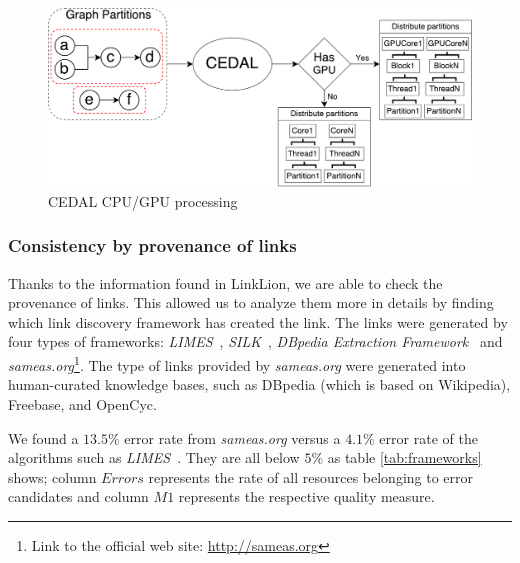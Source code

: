 \begin{figure}[H]
	\centering
	\includegraphics[width=0.9\linewidth]{img/cpugpu4.pdf}
	\caption{CEDAL CPU/GPU processing}
	\label{fig:cpugpu1}
\end{figure}


\subsubsection{Consistency by provenance of links}
Thanks to the information found in LinkLion, we are able to check the provenance of links. This allowed us to analyze them more in details by finding which link discovery framework has created the link. The links were generated by four types of frameworks: \textit{LIMES}~\cite{ngomo2011limes}, \textit{SILK}~\cite{volz2009silk},  \textit{DBpedia Extraction Framework}~\cite{lehmann2015dbpedia} and \textit{sameas.org}\footnote{Link to the official web site: \url{http://sameas.org}}. The type of links provided by \textit{sameas.org} were generated into human-curated knowledge bases, such as DBpedia (which is based on Wikipedia), Freebase, and OpenCyc.

We found a $13.5\%$ error rate from \textit{sameas.org} versus a $4.1\%$ error rate of the algorithms such as \textit{LIMES}~\cite{ngomo2011limes}. They are all below $5\%$ as table \ref{tab:frameworks} shows; column $Errors$ represents the rate of all resources belonging to error candidates and column $M1$ represents the respective quality measure. 

